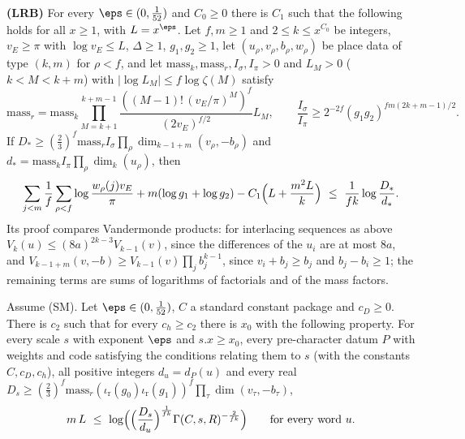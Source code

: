\smallskip\noindent\textbf{(LRB)} For every $\eps\in(0,\frac1{52})$ and $C_0\ge0$ there is $C_1$ such that the following
holds for all $x\ge1$, with $L=x^\eps$. Let $f,m\ge1$ and $2\le k\le x^{C_0}$ be integers, $v_E\ge\pi$ with $\log v_E\le L$,
$\Delta\ge1$, $g_1,g_2\ge1$, let $(u_\rho,v_\rho,b_\rho,w_\rho)$ be place data of type $(k,m)$ for $\rho<f$, and let
$\mathrm{mass}_k,\mathrm{mass}_r,I_\sigma,I_\pi>0$ and $L_M>0$ ($k<M<k+m$) with $|\log L_M|\le f\log\zeta(M)$ satisfy
\[
\mathrm{mass}_r=\mathrm{mass}_k\prod_{M=k+1}^{k+m-1}\frac{((M-1)!\,(v_E/\pi)^M)^f}{(2v_E)^{f/2}}L_M,\qquad
\frac{I_\sigma}{I_\pi}\ge2^{-2f}(g_1g_2)^{fm(2k+m-1)/2}.
\]
If $D_*\ge(\frac23)^f\mathrm{mass}_rI_\sigma\prod_\rho\dim_{k-1+m}(v_\rho,-b_\rho)$ and
$d_*=\mathrm{mass}_kI_\pi\prod_\rho\dim_k(u_\rho)$, then
\[
\sum_{j<m}\frac1f\sum_{\rho<f}\log\frac{w_\rho(j)v_E}{\pi}+m(\log g_1+\log g_2)-C_1\Bigl(L+\frac{m^2L}k\Bigr)\ \le\
\frac1{fk}\log\frac{D_*}{d_*}.
\]
Its proof compares Vandermonde products: for interlacing sequences as above $V_k(u)\le(8a)^{2k-3}V_{k-1}(v)$, since the
differences of the $u_i$ are at most $8a$, and $V_{k-1+m}(v,-b)\ge V_{k-1}(v)\prod_jb_j^{k-1}$, since $v_i+b_j\ge b_j$ and
$b_j-b_i\ge1$; the remaining terms are sums of logarithms of factorials and of the mass factors.

\begin{lemma}[Window lower bound]\label{pf:stageU:winlow}
Assume \textup{(SM)}. Let $\eps\in(0,\frac1{52})$, $C$ a standard constant package and $c_D\ge0$. There is $c_2$ such that for
every $c_h\ge c_2$ there is $x_0$ with the following property. For every scale $s$ with exponent $\eps$ and $s.x\ge x_0$, every
pre-character datum $P$ with weights and code satisfying the conditions relating them to $s$ (with the constants
$C,c_D,c_h$), all positive integers $d_u=d_P(u)$ and every real
$D_s\ge(\frac23)^f\mathrm{mass}_r(\iota_{\mathrm r}(g_0)\iota_{\mathrm r}(g_1))^f\prod_\tau\dim(v_\tau,-b_\tau)$,
\[
m\,L\ \le\ \log\Bigl(\Bigl(\frac{D_s}{d_u}\Bigr)^{\frac1{fk}}\Gamma(C,s,R)^{-\frac2{fk}}\Bigr)\qquad\text{for every word }u.
\]
\end{lemma}

